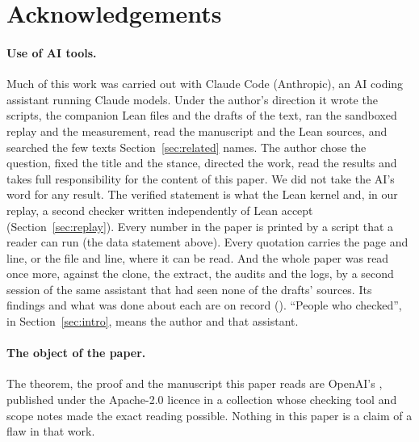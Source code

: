 \section*{Acknowledgements}

\paragraph{Use of AI tools.} Much of this work was carried out with Claude
Code (Anthropic), an AI coding assistant running Claude models. Under the
author's direction it wrote the scripts, the companion Lean files and the
drafts of the text, ran the sandboxed replay and the measurement, read
the manuscript and the Lean sources, and searched the few texts
Section~\ref{sec:related} names. The author chose the question, fixed
the title and the stance, directed the work, read the results and takes
full responsibility for the content of this paper. We did not take the
AI's word for any result. The verified statement is what the Lean kernel
and, in our replay, a second checker written independently of Lean
accept (Section~\ref{sec:replay}). Every number in the paper is printed
by a script that a reader can run (the data statement above). Every
quotation carries the page and line, or the file and line, where it can
be read. And the whole paper was read once more, against the clone, the
extract, the audits and the logs, by a second session of the same
assistant that had seen none of the drafts' sources. Its findings and
what was done about each are on record
(). ``People who checked'', in
Section~\ref{sec:intro}, means the author and that assistant.

\paragraph{The object of the paper.} The theorem, the proof and the
manuscript this paper reads are OpenAI's
\citep{OAI:The-Exponential-Time-Hypothesis-is-False-October-25-2026},
published under the Apache-2.0 licence in a collection whose checking
tool \citep{LeanComparator} and scope notes made the exact reading
possible. Nothing in this paper is a claim of a flaw in that work.

